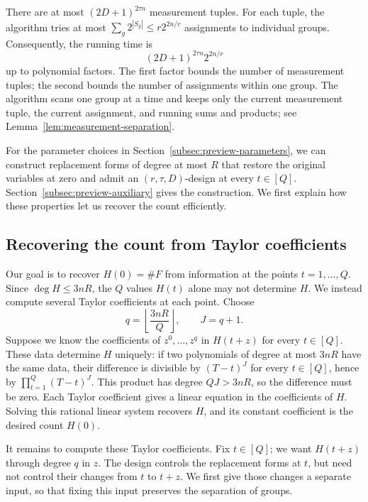 \documentclass[11pt,reqno]{amsart}
\numberwithin{equation}{section}
\theoremstyle{definition}\newtheorem{definition}[theorem]{Definition}
\theoremstyle{remark}\newtheorem{remark}[theorem]{Remark}
\renewcommand{\le}{\leqslant}
\begin{document}
There are at most $(2D+1)^{2\tau n}$ measurement tuples. For each
tuple, the algorithm tries at most
$\sum_g2^{|S_g|}\le r2^{2n/r}$ assignments to individual groups.
Consequently, the running time is
\[
 (2D+1)^{2\tau n}2^{2n/r}
\]
up to polynomial factors. The first factor bounds the number of
measurement tuples; the second bounds the number of assignments
within one group. The algorithm scans one group at a time and
keeps only the current measurement tuple, the current assignment,
and running sums and products; see
Lemma~\ref{lem:measurement-separation}.

For the parameter choices in Section~\ref{subsec:preview-parameters},
we can construct replacement forms of degree at most $R$ that
restore the original variables at zero and admit an
$(r,\tau,D)$-design at every $t\in[Q]$.
Section~\ref{subsec:preview-auxiliary} gives the construction.
We first explain how these properties let us recover the count
efficiently.

\subsection{Recovering the count from Taylor coefficients}
\label{subsec:preview-interpolation}
Our goal is to recover $H(0)=\#F$ from information at the points
$t=1,\ldots,Q$. Since $\deg H\le3nR$, the $Q$ values $H(t)$ alone
may not determine $H$. We instead compute several Taylor
coefficients at each point. Choose
\[
 q=\left\lfloor\frac{3nR}{Q}\right\rfloor,\qquad J=q+1.
\]
Suppose we know the coefficients of $z^0,\ldots,z^q$ in $H(t+z)$
for every $t\in[Q]$. These data determine $H$ uniquely: if two
polynomials of degree at most $3nR$ have the same data, their
difference is divisible by $(T-t)^J$ for every $t\in[Q]$, hence by
$\prod_{t=1}^Q(T-t)^J$. This product has degree $QJ>3nR$, so the
difference must be zero. Each Taylor coefficient gives a linear
equation in the coefficients of $H$. Solving this rational linear
system recovers $H$, and its constant coefficient is the desired
count $H(0)$.

It remains to compute these Taylor coefficients. Fix $t\in[Q]$;
we want $H(t+z)$ through degree $q$ in $z$. The design controls
the replacement forms at $t$, but need not control their changes
from $t$ to $t+z$. We first give those changes a separate input,
so that fixing this input preserves the separation of groups.
\end{document}

